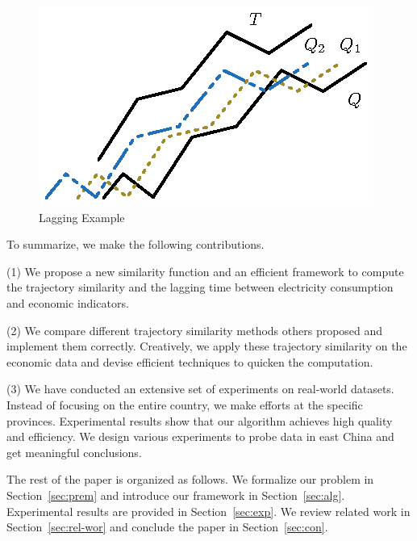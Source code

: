 \begin{figure}[!t]
	\centering
	\vspace{-0.5em}
	\includegraphics[scale=1]{fig/Lagging-Example}
	\vspace{-1.5em}
	\caption{Lagging Example}
	\label{fig:lag-exa}
	\vspace{-1.5em}
\end{figure}

To summarize, we make the following contributions. 

\vspace{.25em}
\noindent (1) We propose a new similarity function and an efficient framework to compute the trajectory similarity and the lagging time between electricity consumption and economic indicators.

\vspace{.25em}
\noindent (2) We compare different trajectory similarity methods others proposed and implement them correctly. Creatively, we apply these trajectory similarity on the economic data and devise efficient techniques to quicken the computation.  

\vspace{.25em}
\noindent (3) We have conducted an extensive set of experiments on real-world datasets. Instead of focusing on the entire country, we make efforts at the specific provinces. Experimental results show that our algorithm achieves high quality and efficiency. We design various experiments to probe data in east China and get meaningful conclusions.

\vspace{.25em}

The rest of the paper is organized as follows. We formalize our problem in Section~\ref{sec:prem} and introduce our framework in Section~\ref{sec:alg}. Experimental results are provided in Section~\ref{sec:exp}. We review related work in Section~\ref{sec:rel-wor} and conclude the paper in Section~\ref{sec:con}.

